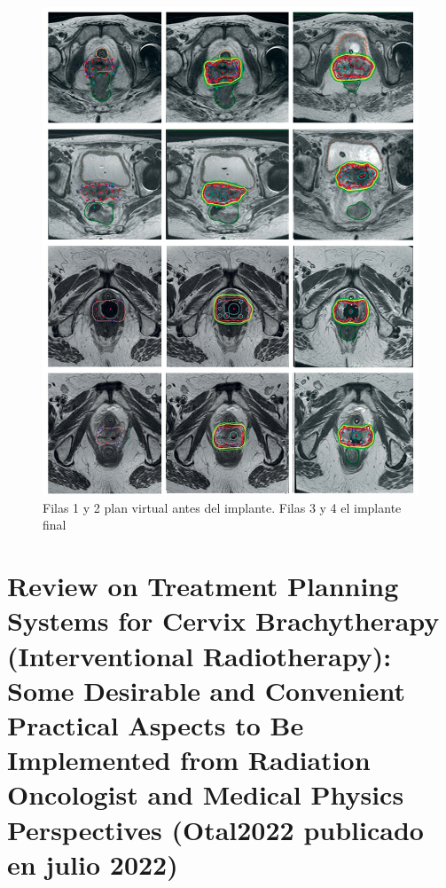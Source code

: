 \documentclass[
  a4paper,
]{scrreprt}
\begin{document}
\begin{figure}

{\centering \includegraphics[width=6.25in,height=\textheight]{img/Preplan2.jpg}

}

\caption{\label{fig-preplan2}Filas 1 y 2 plan virtual antes del
implante. Filas 3 y 4 el implante final}

\end{figure}

\hypertarget{review-on-treatment-planning-systems-for-cervix-brachytherapy-interventional-radiotherapy-some-desirable-and-convenient-practical-aspects-to-be-implemented-from-radiation-oncologist-and-medical-physics-perspectives-otal2022-publicado-en-julio-2022-1}{%
\section{Review on Treatment Planning Systems for Cervix Brachytherapy
(Interventional Radiotherapy): Some Desirable and Convenient Practical
Aspects to Be Implemented from Radiation Oncologist and Medical Physics
Perspectives (Otal2022 publicado en julio
2022)}\label{review-on-treatment-planning-systems-for-cervix-brachytherapy-interventional-radiotherapy-some-desirable-and-convenient-practical-aspects-to-be-implemented-from-radiation-oncologist-and-medical-physics-perspectives-otal2022-publicado-en-julio-2022-1}}
\end{document}
